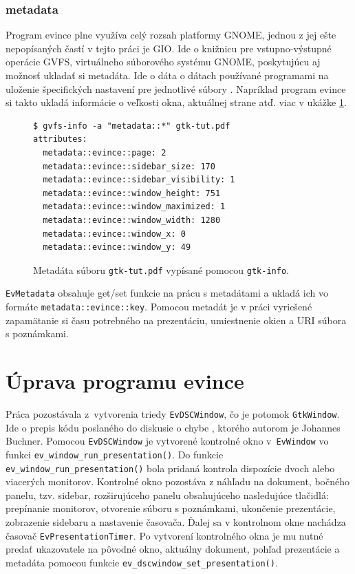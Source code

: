 \documentclass[12pt,oneside,final]{fithesis2}
\begin{document}
\subsection{metadata}
Program evince plne využíva celý rozsah platformy GNOME, jednou z jej ešte nepopísaných častí v tejto práci je GIO. Ide o knižnicu pre vstupno-výstupné operácie GVFS, virtuálneho súborového systému GNOME, poskytujúcu aj možnosť ukladať si metadáta. Ide o dáta o dátach používané programami na uloženie špecifických nastavení pre jednotlivé súbory \cite{metad}. Napríklad program evince si takto ukladá informácie o veľkosti okna, aktuálnej strane atď. viac v ukážke \ref{meta}.
\begin{figure}[hbpt]
\begin{tiny}
\begin{verbatim}
$ gvfs-info -a "metadata::*" gtk-tut.pdf 
attributes:
  metadata::evince::page: 2
  metadata::evince::sidebar_size: 170
  metadata::evince::sidebar_visibility: 1
  metadata::evince::window_height: 751
  metadata::evince::window_maximized: 1
  metadata::evince::window_width: 1280
  metadata::evince::window_x: 0
  metadata::evince::window_y: 49
\end{verbatim}
\end{tiny}
\caption{Metadáta súboru \texttt{gtk-tut.pdf} vypísané pomocou \texttt{gtk-info}.}
\label{meta}
\end{figure}

\texttt{EvMetadata} obsahuje get/set funkcie na prácu s metadátami a ukladá ich vo formáte \texttt{metadata::evince::key}. Pomocou metadát je v práci vyriešené zapamätanie si času potrebného na prezentáciu, umiestnenie okien a URI súbora s poznámkami.

\chapter{Úprava programu evince}
Práca pozostávala z~vytvorenia triedy \texttt{EvDSCWindow}, čo je potomok \texttt{GtkWindow}. Ide o prepis kódu poslaného do diskusie o chybe \cite{evbug}, ktorého autorom je Johannes Buchner. Pomocou \texttt{EvDSCWindow} je vytvorené kontrolné okno v~\texttt{EvWindow} vo funkci \texttt{ev\_\-window\_\-run\_\-presentation()}. Do funkcie \texttt{ev\_\-window\_\-run\_\-presentation()} bola pridaná kontrola dispozície dvoch alebo viacerých monitorov. Kontrolné okno pozostáva z náhľadu na dokument, bočného panelu, tzv. sidebar, rozširujúceho panelu obsahujúceho nasledujúce tlačidlá: prepínanie monitorov, otvorenie súboru s poznámkami, ukončenie prezentácie, zobrazenie sidebaru a nastavenie časovača. Ďalej sa v kontrolnom okne nachádza časovač \texttt{EvPresentationTimer}. Po vytvorení kontrolného okna je mu nutné predať ukazovatele na pôvodné okno, aktuálny dokument, pohľad prezentácie a metadáta pomocou funkcie \texttt{ev\_\-dscwindow\_\-set\_\-presentation()}.
\end{document}
